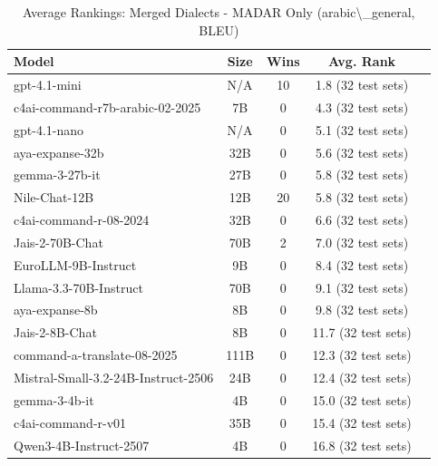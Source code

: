 \begin{table}[htbp]
\centering
\caption{Average Rankings: Merged Dialects - MADAR Only (arabic\textbackslash{}_general, BLEU)}
\label{tab:avg_rankings_bleu_arabic_general}
\begin{tabular}{l@{\hspace{3pt}}c@{\hspace{3pt}}c@{\hspace{3pt}}c@{\hspace{3pt}}c}
\toprule
Model & Size & Wins & Avg. Rank \\
\midrule
gpt-4.1-mini & N/A & 10 & 1.8 (32 test sets) \\
c4ai-command-r7b-arabic-02-2025 & 7B & 0 & 4.3 (32 test sets) \\
gpt-4.1-nano & N/A & 0 & 5.1 (32 test sets) \\
aya-expanse-32b & 32B & 0 & 5.6 (32 test sets) \\
gemma-3-27b-it & 27B & 0 & 5.8 (32 test sets) \\
Nile-Chat-12B & 12B & 20 & 5.8 (32 test sets) \\
c4ai-command-r-08-2024 & 32B & 0 & 6.6 (32 test sets) \\
Jais-2-70B-Chat & 70B & 2 & 7.0 (32 test sets) \\
EuroLLM-9B-Instruct & 9B & 0 & 8.4 (32 test sets) \\
Llama-3.3-70B-Instruct & 70B & 0 & 9.1 (32 test sets) \\
aya-expanse-8b & 8B & 0 & 9.8 (32 test sets) \\
Jais-2-8B-Chat & 8B & 0 & 11.7 (32 test sets) \\
command-a-translate-08-2025 & 111B & 0 & 12.3 (32 test sets) \\
Mistral-Small-3.2-24B-Instruct-2506 & 24B & 0 & 12.4 (32 test sets) \\
gemma-3-4b-it & 4B & 0 & 15.0 (32 test sets) \\
c4ai-command-r-v01 & 35B & 0 & 15.4 (32 test sets) \\
Qwen3-4B-Instruct-2507 & 4B & 0 & 16.8 (32 test sets) \\
\bottomrule
\end{tabular}
\end{table}